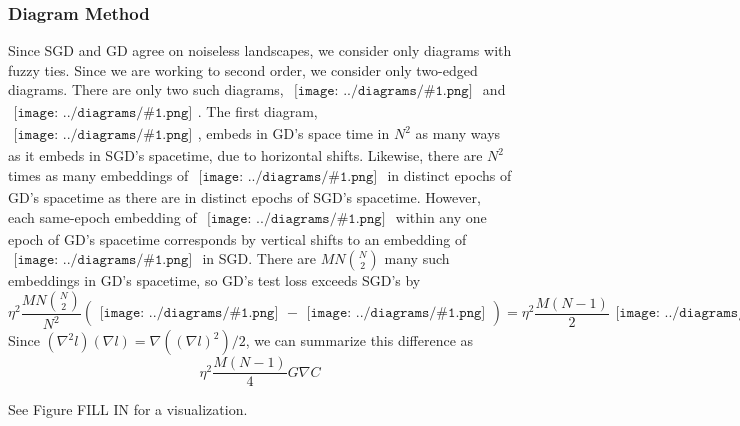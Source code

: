 \documentclass{article}
\newcommand{\sdia}[1]{\begin{gathered}\texttt{[image: ../diagrams/\#1.png]}\end{gathered}}
\begin{document}
        \subsubsection*{Diagram Method}
        Since SGD and GD agree on noiseless landscapes, we consider only
        diagrams with fuzzy ties.  Since we are working to second order, we
        consider only two-edged diagrams.  There are only two such diagrams,
        $\sdia{(01-2)(02-12)}$ and
        $\sdia{(01-2)(01-12)}$.
        The first diagram, $\sdia{(01-2)(02-12)}$, embeds in GD's space time in
        $N^2$ as many ways as it embeds in SGD's spacetime, due to horizontal
        shifts.
        Likewise, there are $N^2$ times as many embeddings of
        $\sdia{(01-2)(02-12)}$ in distinct epochs of GD's spacetime as there
        are in distinct epochs of SGD's spacetime.
        However, each same-epoch embedding of $\sdia{(01-2)(01-12)}$ within 
        any one epoch of GD's spacetime corresponds by vertical shifts to
        an embedding of $\sdia{(0-1-2)(01-12)}$ in SGD.  There are $MN{N\choose 2}$ 
        many such embeddings in GD's spacetime, so GD's test loss exceeds SGD's
        by 
        $$
            \eta^2 \frac{MN{N\choose 2}}{N^2} (\sdia{(01-2)(01-12)} - \sdia{(0-1-2)(01-12)}) 
            =
            \eta^2 \frac{M(N-1)}{2} \sdia{c(01-2)(01-12)}
        $$
        Since $(\nabla^2 l) (\nabla l) = \nabla((\nabla l)^2)/2$, we can 
        summarize this difference as
        $$
            \eta^2 \frac{M(N-1)}{4}
            G \nabla C 
        $$

        See Figure FILL IN for a visualization.
\end{document}
